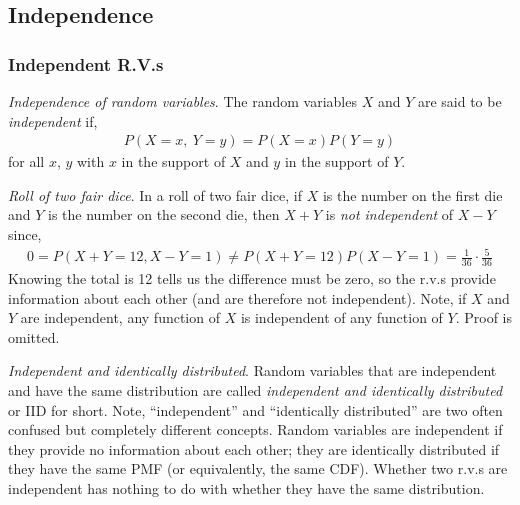 \documentclass[11pt,a4paper]{article}
\begin{document}
\subsection{Independence}

\subsubsection{Independent R.V.s}

\emph{Independence of random variables}. 
 The random variables \(X\) and \(Y\) are said to be \emph{independent} if,
\begin{align}
P(X = x,\ Y = y) = P(X = x)P(Y = y)
\end{align}
for all \(x\), \(y\) with \(x\) in the support of \(X\) and \(y\) in the support of \(Y\).

\emph{Roll of two fair dice}. 
In a roll of two fair dice, 
if \(X\) is the number on the first die and \(Y\) is the number on the second die,
then \(X + Y\) is \emph{not independent} of \(X - Y\) since,
\begin{align}
0 = P(X + Y = 12,X - Y = 1) \neq P(X + Y = 12)P(X - Y = 1) = \frac{1}{36} \cdot \frac{5}{36}
\end{align}
Knowing the total is 12 tells us the difference must be zero, 
so the r.v.s provide information about each other (and are therefore not independent). 
Note, if \(X\) and \(Y\) are independent, any function of
\(X\) is independent of any function of \(Y\). 
Proof is omitted.

\emph{Independent and identically distributed}. 
Random variables that are independent and have the same distribution 
are called \emph{independent and identically distributed} or IID for short.
Note, ``independent'' and ``identically distributed'' 
are two often confused but completely different concepts. 
Random variables are independent if they provide no information about each other; 
they are identically distributed if they have the same PMF (or equivalently, the same CDF). 
Whether two r.v.s are independent has nothing to do with
whether they have the same distribution.
\end{document}
